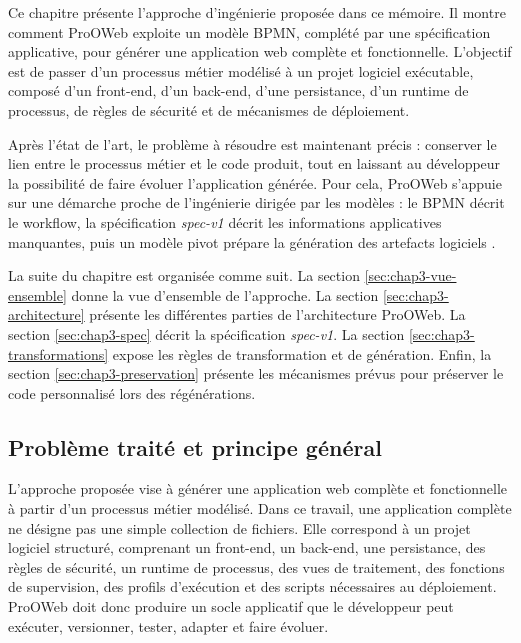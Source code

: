 ﻿%
\label{chap:approche-prooweb}


Ce chapitre présente l'approche d'ingénierie proposée dans ce mémoire. Il montre comment ProOWeb exploite un modèle BPMN, complété par une spécification applicative, pour générer une application web complète et fonctionnelle. L'objectif est de passer d'un processus métier modélisé à un projet logiciel exécutable, composé d'un front-end, d'un back-end, d'une persistance, d'un runtime de processus, de règles de sécurité et de mécanismes de déploiement.

Après l'état de l'art, le problème à résoudre est maintenant précis : conserver le lien entre le processus métier et le code produit, tout en laissant au développeur la possibilité de faire évoluer l'application générée. Pour cela, ProOWeb s'appuie sur une démarche proche de l'ingénierie dirigée par les modèles : le BPMN décrit le workflow, la spécification \textit{spec-v1} décrit les informations applicatives manquantes, puis un modèle pivot prépare la génération des artefacts logiciels \cite{omg2014mda,omg2013bpmn}.

La suite du chapitre est organisée comme suit. La section \ref{sec:chap3-vue-ensemble} donne la vue d'ensemble de l'approche. La section \ref{sec:chap3-architecture} présente les différentes parties de l'architecture ProOWeb. La section \ref{sec:chap3-spec} décrit la spécification \textit{spec-v1}. La section \ref{sec:chap3-transformations} expose les règles de transformation et de génération. Enfin, la section \ref{sec:chap3-preservation} présente les mécanismes prévus pour préserver le code personnalisé lors des régénérations.
\label{sec:chap3-vue-ensemble}

\subsection{Problème traité et principe général}

L'approche proposée vise à générer une application web complète et fonctionnelle à partir d'un processus métier modélisé. Dans ce travail, une application complète ne désigne pas une simple collection de fichiers. Elle correspond à un projet logiciel structuré, comprenant un front-end, un back-end, une persistance, des règles de sécurité, un runtime de processus, des vues de traitement, des fonctions de supervision, des profils d'exécution et des scripts nécessaires au déploiement. ProOWeb doit donc produire un socle applicatif que le développeur peut exécuter, versionner, tester, adapter et faire évoluer.

